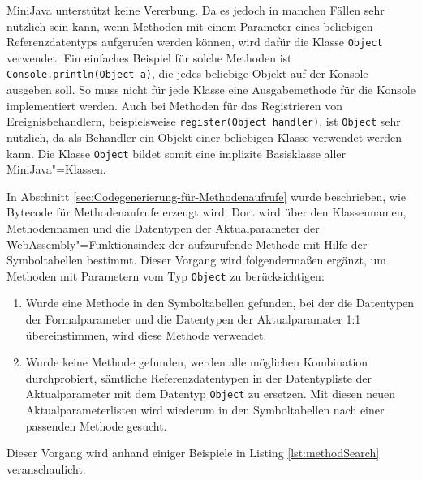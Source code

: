MiniJava unterstützt keine Vererbung. Da es jedoch in manchen Fällen sehr nützlich sein kann, wenn Methoden mit einem Parameter eines beliebigen Referenzdatentyps aufgerufen werden können, wird dafür die Klasse \lstinline{Object} verwendet. Ein einfaches Beispiel für solche Methoden ist \lstinline{Console.println(Object a)}, die jedes beliebige Objekt auf der Konsole ausgeben soll. So muss nicht für jede Klasse eine Ausgabemethode für die Konsole implementiert werden. Auch bei Methoden für das Registrieren von Ereignisbehandlern, beispielsweise \lstinline{register(Object handler)}, ist \lstinline{Object} sehr nützlich, da als Behandler ein Objekt einer beliebigen Klasse verwendet werden kann. Die Klasse \lstinline{Object} bildet somit eine implizite Basisklasse aller MiniJava"=Klassen.

In Abschnitt \ref{sec:Codegenerierung-für-Methodenaufrufe} wurde beschrieben, wie Bytecode für Methodenaufrufe erzeugt wird. Dort wird über den Klassennamen, Methodennamen und die Datentypen der Aktualparameter der WebAssembly"=Funktionsindex der aufzurufende Methode mit Hilfe der Symboltabellen bestimmt. Dieser Vorgang wird folgendermaßen ergänzt, um Methoden mit Parametern vom Typ \lstinline{Object} zu berücksichtigen:

\begin{enumerate}
    \item Wurde eine Methode in den Symboltabellen gefunden, bei der die Datentypen der Formalparameter und die Datentypen der Aktualparamater 1:1 übereinstimmen, wird diese Methode verwendet.
    \item Wurde keine Methode gefunden, werden alle möglichen Kombination durchprobiert, sämtliche Referenzdatentypen in der Datentypliste der Aktualparameter mit dem Datentyp \lstinline{Object} zu ersetzen. Mit diesen neuen Aktualparameterlisten wird wiederum in den Symboltabellen nach einer passenden Methode gesucht.
\end{enumerate}

Dieser Vorgang wird anhand einiger Beispiele in Listing \ref{lst:methodSearch} veranschaulicht.

\pagebreak


